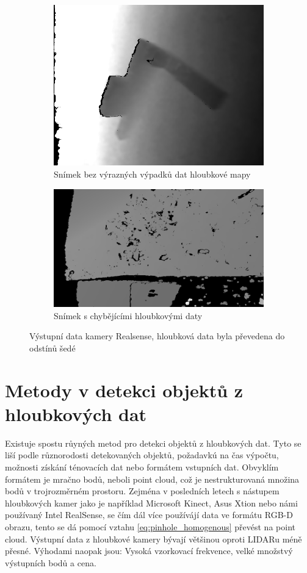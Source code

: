 \documentclass[twoside]{ctuthesis}
\begin{document}
\begin{figure}
\centering
\begin{subfigure}{0.48\textwidth}
  \centering
  \includegraphics[width=0.9\linewidth]{pictures/good_realsense.png}
  \caption{Snímek bez výrazných výpadků dat hloubkové mapy}
  \label{fig:rs_good}
\end{subfigure}
\begin{subfigure}{0.49\textwidth}
  \centering
  \includegraphics[width=0.9\linewidth]{pictures/bad_realsense.png}
  \caption{Snímek s chybějícími hloubkovými daty}
  \label{fig:rs_bad}
\end{subfigure}
\caption{Výstupní data kamery Realsense, hloubková data byla převedena do odstínů šedé}
\label{fig:realsense_pics}
\end{figure}

\section{Metody v detekci objektů z hloubkových dat}
\label{sec:Metody_detekce}
Existuje spostu růyných metod pro detekci objektů z hloubkových dat. Tyto se liší podle různorodosti detekovaných objektů, požadavkú na čas výpočtu, možnosti získání ténovacích dat nebo formátem vstupních dat. Obvyklím formátem je mračno bodů, neboli point cloud, což je nestrukturovaná množina bodů v trojrozměrném prostoru. Zejména v posledních letech s nástupem hloubkových kamer jako je například Microsoft Kinect, Asus Xtion nebo námi používaný Intel RealSense, se čím dál více používájí data ve formátu RGB-D obrazu, tento se dá pomocí vztahu \ref{eq:pinhole_homogenous} převést na point cloud. Výstupní data z hloubkové kamery bývají většinou oproti LIDARu méně přesné. Výhodami naopak jsou: Vysoká vzorkovací frekvence, velké množstvý výstupních bodů a cena.
\end{document}
